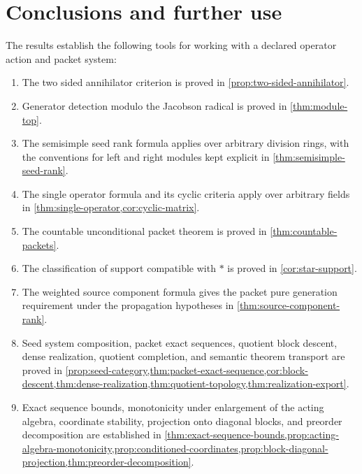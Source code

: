 \clearpage\section{Conclusions and further use}

The results establish the following tools for working with a declared operator action and packet system:
\begin{enumerate}[label=\textbf{I.\arabic*.},leftmargin=*,itemsep=0.3em,topsep=0.4em]
\item The two sided annihilator criterion is proved in \cref{prop:two-sided-annihilator}.
\item Generator detection modulo the Jacobson radical is proved in \cref{thm:module-top}.
\item The semisimple seed rank formula applies over arbitrary division rings, with the conventions for left and right modules kept explicit in \cref{thm:semisimple-seed-rank}.
\item The single operator formula and its cyclic criteria apply over arbitrary fields in \cref{thm:single-operator,cor:cyclic-matrix}.
\item The countable unconditional packet theorem is proved in \cref{thm:countable-packets}.
\item The classification of support compatible with $*$ is proved in \cref{cor:star-support}.
\item The weighted source component formula gives the packet pure generation requirement under the propagation hypotheses in \cref{thm:source-component-rank}.
\item Seed system composition, packet exact sequences, quotient block descent, dense realization, quotient completion, and semantic theorem transport are proved in \cref{prop:seed-category,thm:packet-exact-sequence,cor:block-descent,thm:dense-realization,thm:quotient-topology,thm:realization-export}.
\item Exact sequence bounds, monotonicity under enlargement of the acting algebra, coordinate stability, projection onto diagonal blocks, and preorder decomposition are established in \cref{thm:exact-sequence-bounds,prop:acting-algebra-monotonicity,prop:conditioned-coordinates,prop:block-diagonal-projection,thm:preorder-decomposition}.
\end{enumerate}

\clearpage\appendix
